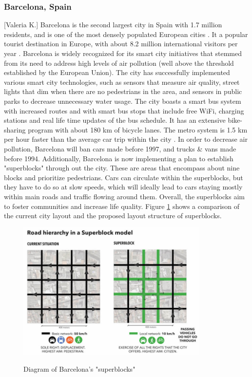 \documentclass[12pt]{article}                               %
\begin{document}
\subsubsection{Barcelona, Spain}[Valeria K.]
Barcelona is the second largest city in Spain with 1.7 million residents, and is one of the most densely populated European cities \cite{Bausells2016}. It a popular tourist destination in Europe, with about 8.2 million international visitors per year \cite{Bausells2016}. Barcelona is widely recognized for its smart city initiatives that stemmed from its need to address high levels of air pollution (well above the threshold established by the European Union). The city has successfully implemented various smart city technologies, such as sensors that measure air quality, street lights that dim when there are no pedestrians in the area, and sensors in public parks to decrease unnecessary water usage. The city boasts a smart bus system with increased routes and with smart bus stops that include free WiFi, charging stations and real life time updates of the bus schedule. It has an extensive bike-sharing program with about 180 km of bicycle lanes. The metro system is 1.5 km per hour faster than the average car trip within the city \cite{Bausells2016}. In order to decrease air pollution, Barcelona will ban cars made before 1997, and trucks \& vans made before 1994. Additionally, Barcelona is now implementing a plan to establish "superblocks" through out the city. These are areas that encompass about nine blocks and prioritize pedestrians. Cars can circulate within the superblocks, but they have to do so at slow speeds, which will ideally lead to cars staying mostly within main roads and traffic flowing around them. Overall, the superblocks aim to foster communities and increase life quality. Figure \ref{img:barcelona_superblock} shows a comparison of the current city layout and the proposed layout structure of superblocks.

\begin{figure}[H]
    \centering
    \includegraphics[width=0.85\textwidth]{images/barcelona_superblock.jpg}
    \caption{Diagram of Barcelona's "superblocks"}
    \cite{Streetfilms2018}
    \label{img:barcelona_superblock}
\end{figure}
\end{document}

